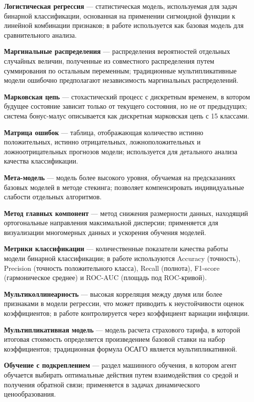 \textbf{Логистическая регрессия} --- статистическая модель, используемая для задач бинарной классификации, основанная на применении сигмоидной функции к линейной комбинации признаков; в работе используется как базовая модель для сравнительного анализа.

\textbf{Маргинальные распределения} --- распределения вероятностей отдельных случайных величин, полученные из совместного распределения путем суммирования по остальным переменным; традиционные мультипликативные модели ошибочно предполагают независимость маргинальных распределений.

\textbf{Марковская цепь} --- стохастический процесс с дискретным временем, в котором будущее состояние зависит только от текущего состояния, но не от предыдущих; система бонус-малус описывается как дискретная марковская цепь с 15 классами.

\textbf{Матрица ошибок} --- таблица, отображающая количество истинно положительных, истинно отрицательных, ложноположительных и ложноотрицательных прогнозов модели; используется для детального анализа качества классификации.

\textbf{Мета-модель} --- модель более высокого уровня, обучаемая на предсказаниях базовых моделей в методе стекинга; позволяет компенсировать индивидуальные слабости отдельных алгоритмов.

\textbf{Метод главных компонент} --- метод снижения размерности данных, находящий ортогональные направления максимальной дисперсии; применяется для визуализации многомерных данных и ускорения обучения моделей.

\textbf{Метрики классификации} --- количественные показатели качества работы модели бинарной классификации; в работе используются Accuracy (точность), Precision (точность положительного класса), Recall (полнота), F1-score (гармоническое среднее) и ROC-AUC (площадь под ROC-кривой).

\textbf{Мультиколлинеарность} --- высокая корреляция между двумя или более признаками в модели регрессии, что может приводить к неустойчивости оценок коэффициентов; в работе контролируется через коэффициент вариации инфляции.

\textbf{Мультипликативная модель} --- модель расчета страхового тарифа, в которой итоговая стоимость определяется произведением базовой ставки на набор коэффициентов; традиционная формула ОСАГО является мультипликативной.

\textbf{Обучение с подкреплением} --- раздел машинного обучения, в котором агент обучается выбирать оптимальные действия путем взаимодействия со средой и получения обратной связи; применяется в задачах динамического ценообразования.

